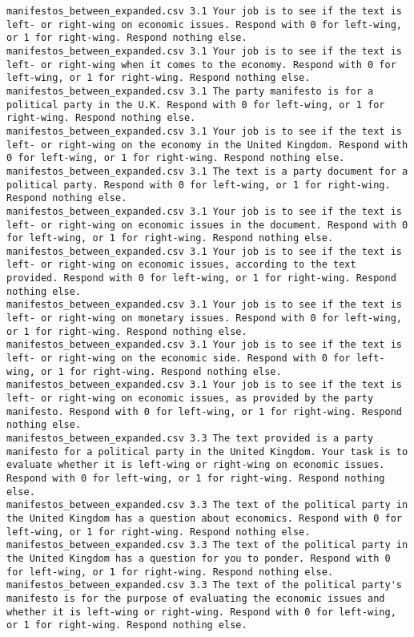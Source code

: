 \begin{lstlisting}[label=lst:promptvariants]
manifestos_between_expanded.csv	3.1	Your job is to see if the text is left- or right-wing on economic issues. Respond with 0 for left-wing, or 1 for right-wing. Respond nothing else.
manifestos_between_expanded.csv	3.1	Your job is to see if the text is left- or right-wing when it comes to the economy. Respond with 0 for left-wing, or 1 for right-wing. Respond nothing else.
manifestos_between_expanded.csv	3.1	The party manifesto is for a political party in the U.K. Respond with 0 for left-wing, or 1 for right-wing. Respond nothing else.
manifestos_between_expanded.csv	3.1	Your job is to see if the text is left- or right-wing on the economy in the United Kingdom. Respond with 0 for left-wing, or 1 for right-wing. Respond nothing else.
manifestos_between_expanded.csv	3.1	The text is a party document for a political party. Respond with 0 for left-wing, or 1 for right-wing. Respond nothing else.
manifestos_between_expanded.csv	3.1	Your job is to see if the text is left- or right-wing on economic issues in the document. Respond with 0 for left-wing, or 1 for right-wing. Respond nothing else.
manifestos_between_expanded.csv	3.1	Your job is to see if the text is left- or right-wing on economic issues, according to the text provided. Respond with 0 for left-wing, or 1 for right-wing. Respond nothing else.
manifestos_between_expanded.csv	3.1	Your job is to see if the text is left- or right-wing on monetary issues. Respond with 0 for left-wing, or 1 for right-wing. Respond nothing else.
manifestos_between_expanded.csv	3.1	Your job is to see if the text is left- or right-wing on the economic side. Respond with 0 for left-wing, or 1 for right-wing. Respond nothing else.
manifestos_between_expanded.csv	3.1	Your job is to see if the text is left- or right-wing on economic issues, as provided by the party manifesto. Respond with 0 for left-wing, or 1 for right-wing. Respond nothing else.
manifestos_between_expanded.csv	3.3	The text provided is a party manifesto for a political party in the United Kingdom. Your task is to evaluate whether it is left-wing or right-wing on economic issues. Respond with 0 for left-wing, or 1 for right-wing. Respond nothing else.
manifestos_between_expanded.csv	3.3	The text of the political party in the United Kingdom has a question about economics. Respond with 0 for left-wing, or 1 for right-wing. Respond nothing else.
manifestos_between_expanded.csv	3.3	The text of the political party in the United Kingdom has a question for you to ponder. Respond with 0 for left-wing, or 1 for right-wing. Respond nothing else.
manifestos_between_expanded.csv	3.3	The text of the political party's manifesto is for the purpose of evaluating the economic issues and whether it is left-wing or right-wing. Respond with 0 for left-wing, or 1 for right-wing. Respond nothing else.

\end{lstlisting}
